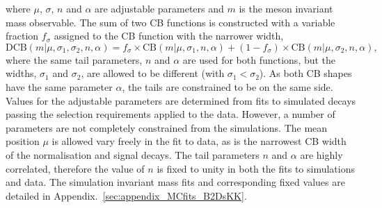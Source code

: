 where $\mu$, $\sigma$, $n$ and $\alpha$ are adjustable parameters and $m$ is the \B meson invariant mass observable.
The sum of two CB functions is constructed with a variable fraction $f_\sigma$ assigned to the CB function with the narrower width,
\begin{equation}
\text{DCB}(m|\mu,\sigma_1,\sigma_2,n,\alpha) = f_\sigma \times \text{CB}(m|\mu,\sigma_1,n,\alpha) + (1-f_\sigma) \times \text{CB}(m|\mu,\sigma_2,n,\alpha),
\label{eq:DoubleBD}
\end{equation}
where the same tail parameters, $n$ and $\alpha$ are used for both functions, but the widths, $\sigma_1$ and $\sigma_2$, are allowed to be different (with $\sigma_1 < \sigma_2$).
As both CB shapes have the same parameter $\alpha$, the tails are constrained to be on the same side.
Values for the adjustable parameters are determined from fits to simulated decays passing the selection requirements applied to the data. 
However, a number of parameters are not completely constrained from the simulations. The mean position $\mu$ is allowed vary freely in the fit to data, as is the narrowest CB width of the normalisation and signal decays. 
The tail parameters $n$ and $\alpha$ are highly correlated, therefore the value of $n$ is fixed to unity in both the fits to simulations and data. 
The simulation invariant mass fits and corresponding fixed values are detailed in Appendix.~\ref{sec:appendix_MCfits_B2DsKK}. 



